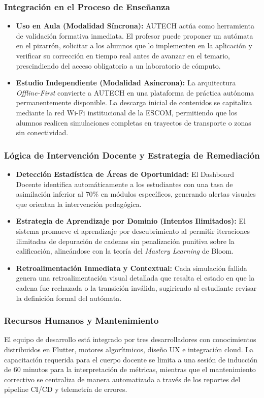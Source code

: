 \subsubsection{Integración en el Proceso de Enseñanza}
\begin{itemize}
    \item \textbf{Uso en Aula (Modalidad Síncrona):} AUTECH actúa como herramienta de validación formativa inmediata. El profesor puede proponer un autómata en el pizarrón, solicitar a los alumnos que lo implementen en la aplicación y verificar su corrección en tiempo real antes de avanzar en el temario, prescindiendo del acceso obligatorio a un laboratorio de cómputo.
    \item \textbf{Estudio Independiente (Modalidad Asíncrona):} La arquitectura \textit{Offline-First} convierte a AUTECH en una plataforma de práctica autónoma permanentemente disponible. La descarga inicial de contenidos se capitaliza mediante la red Wi-Fi institucional de la ESCOM, permitiendo que los alumnos realicen simulaciones completas en trayectos de transporte o zonas sin conectividad.
\end{itemize}

\subsubsection{Lógica de Intervención Docente y Estrategia de Remediación}
\begin{itemize}
    \item \textbf{Detección Estadística de Áreas de Oportunidad:} El Dashboard Docente identifica automáticamente a los estudiantes con una tasa de asimilación inferior al $70\%$ en módulos específicos, generando alertas visuales que orientan la intervención pedagógica.
    \item \textbf{Estrategia de Aprendizaje por Dominio (Intentos Ilimitados):} El sistema promueve el aprendizaje por descubrimiento al permitir iteraciones ilimitadas de depuración de cadenas sin penalización punitiva sobre la calificación, alineándose con la teoría del \textit{Mastery Learning} de Bloom.
    \item \textbf{Retroalimentación Inmediata y Contextual:} Cada simulación fallida genera una retroalimentación visual detallada que resalta el estado en que la cadena fue rechazada o la transición inválida, sugiriendo al estudiante revisar la definición formal del autómata.
\end{itemize}

\subsubsection{Recursos Humanos y Mantenimiento}
El equipo de desarrollo está integrado por tres desarrolladores con conocimientos distribuidos en Flutter, motores algorítmicos, diseño UX e integración cloud. La capacitación requerida para el cuerpo docente se limita a una sesión de inducción de 60 minutos para la interpretación de métricas, mientras que el mantenimiento correctivo se centraliza de manera automatizada a través de los reportes del pipeline CI/CD y telemetría de errores.

